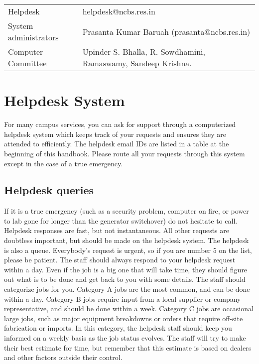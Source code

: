 \documentclass[a4paper,10pt]{article}
\begin{document}
\begin{tabular}{l l}
Helpdesk & helpdesk@ncbs.res.in \\
System administrators & Prasanta Kumar Baruah (prasanta@ncbs.res.in) \\
Computer Committee & Upinder S. Bhalla, R. Sowdhamini, Ramaswamy, Sandeep Krishna.
\end{tabular}

\section{Helpdesk System}

For many campus services, you can ask for support through a computerized helpdesk system
which keeps track of your requests and ensures they are attended to efficiently. The
helpdesk email IDs are listed in a table at the beginning of this handbook. Please route all
your requests through this system except in the case of a true emergency.

\subsection{Helpdesk queries}
If it is a true emergency (such as a security problem, computer on fire, or
power to lab gone for longer than the generator switchover) do not hesitate to call. Helpdesk
responses are fast, but not instantaneous. All other requests are doubtless important, but
should be made on the helpdesk system.
The helpdesk is also a queue. Everybody's request is urgent, so if you are number 5 on the
list, please be patient.
The staff should always respond to your helpdesk request within a day. Even if the job is a
big one that will take time, they should figure out what is to be done and get back to you
with some details.
The staff should categorize jobs for you. Category A jobs are the most common, and can be
done within a day. Category B jobs require input from a local supplier or company
representative, and should be done within a week. Category C jobs are occasional large jobs,
such as major equipment breakdowns or orders that require off-site fabrication or imports. In
this category, the helpdesk staff should keep you informed on a weekly basis as the job
status evolves. The staff will try to make their best estimate for time, but remember that this
estimate is based on dealers and other factors outside their control.
\end{document}
